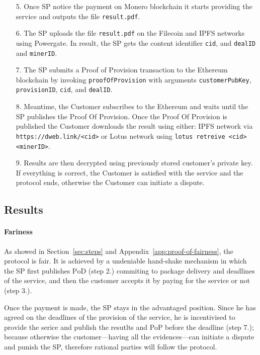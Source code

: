 \documentclass{ieeeaccess}
\begin{document}
\begin{enumerate}
  \item[5.] Once SP notice the payment on Monero blockchain it starts providing the service and outputs the file \texttt{result.pdf}.

  \item[6.] The SP uploads the file \texttt{result.pdf} on the Filecoin and IPFS networks using Powergate. In result, the SP gets the content identifier \texttt{cid}, and \texttt{dealID} and \texttt{minerID}.

  \item[7.] The SP submits a Proof of Provision transaction to the Ethereum blockchain by invoking \texttt{proofOfProvision} with arguments \texttt{customer\-PubKey}, \texttt{provisionID}, \texttt{cid}, and \texttt{dealID}.

  \item[8.] Meantime, the Customer subscribes to the Ethereum and waits until the SP publishes the Proof Of Provision.
 Once the Proof Of Provision is published the Customer downloads the result using either: IPFS network via \texttt{https://dweb.link/<cid>} or Lotus network using \texttt{lotus retreive <cid> <minerID>}. 
 
  \item[9.] Results are then decrypted using previously stored customer's private key. If everything is correct, the Customer is satisfied with the service and the protocol ends, otherwise the Customer can initiate a dispute.

\end{enumerate}

\subsection{Results}


\paragraph{Fariness}
As showed in Section~\ref{sec:steps} and Appendix~\ref{app:proof-of-fairness}, the protocol is fair. It is achieved by a undeniable hand-shake mechanism in which the SP first publishes $\mathrm{PoD}$ (step 2.) commiting to package delivery and deadlines of the service, and then the customer accepts it by paying for the service or not (step 3.).

Once the payment is made, the SP stays in the advantaged position. Since he has agreed on the deadlines of the provision of the service, he is incentivised to provide the serice and publish the resutlts and PoP before the deadline (step 7.); because otherwise the customer—having all the evidences—can initiate a dispute and punish the SP, therefore rational parties will follow the protocol.
\end{document}
